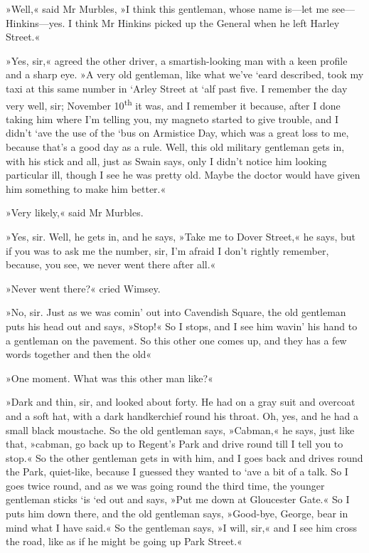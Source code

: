 »Well,« said Mr Murbles, »I think this gentleman, whose name is—let me see—Hinkins—yes. I think Mr Hinkins picked up the General when he left Harley Street.«

»Yes, sir,« agreed the other driver, a smartish-looking man with a keen profile and a sharp eye. »A very old gentleman, like what we've `eard described, took my taxi at this same number in `Arley Street at `alf past five. I remember the day very well, sir; November  10\textsuperscript{th} it was, and I remember it because, after I done taking him where I'm telling you, my magneto started to give trouble, and I didn't `ave the use of the `bus on Armistice Day, which was a great loss to me, because that's a good day as a rule. Well, this old military gentleman gets in, with his stick and all, just as Swain says, only I didn't notice him looking particular ill, though I see he was pretty old. Maybe the doctor would have given him something to make him better.«

»Very likely,« said Mr Murbles.

»Yes, sir. Well, he gets in, and he says, »Take me to Dover Street,« he says, but if you was to ask me the number, sir, I'm afraid I don't rightly remember, because, you see, we never went there after all.«

»Never went there?« cried Wimsey.

»No, sir. Just as we was comin' out into Cavendish Square, the old gentleman puts his head out and says, »Stop!« So I stops, and I see him wavin' his hand to a gentleman on the pavement. So this other one comes up, and they has a few words together and then the old\longdash«

»One moment. What was this other man like?«

»Dark and thin, sir, and looked about forty. He had on a gray suit and overcoat and a soft hat, with a dark handkerchief round his throat. Oh, yes, and he had a small black moustache. So the old gentleman says, »Cabman,« he says, just like that, »cabman, go back up to Regent's Park and drive round till I tell you to stop.« So the other gentleman gets in with him, and I goes back and drives round the Park, quiet-like, because I guessed they wanted to `ave a bit of a talk. So I goes twice round, and as we was going round the third time, the younger gentleman sticks `is `ed out and says, »Put me down at Gloucester Gate.« So I puts him down there, and the old gentleman says, »Good-bye, George, bear in mind what I have said.« So the gentleman says, »I will, sir,« and I see him cross the road, like as if he might be going up Park Street.«

